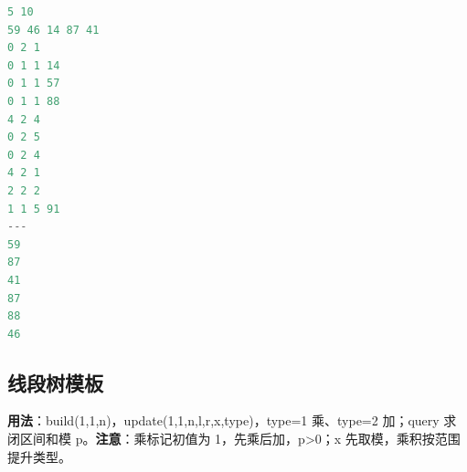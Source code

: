 \documentclass[a4paper,9pt]{extarticle}
\begin{document}
\begin{lstlisting}[language={C++}]
5 10
59 46 14 87 41
0 2 1
0 1 1 14
0 1 1 57
0 1 1 88
4 2 4
0 2 5
0 2 4
4 2 1
2 2 2
1 1 5 91
---
59
87
41
87
88
46
\end{lstlisting}

\subsection{线段树模板}

\textbf{用法}：build(\allowbreak{}1,\allowbreak{}1,\allowbreak{}n)，update(\allowbreak{}1,\allowbreak{}1,\allowbreak{}n,\allowbreak{}l,\allowbreak{}r,\allowbreak{}x,\allowbreak{}type)，type=\allowbreak{}1 乘、type=2 加；query 求闭区间和模 p。\textbf{注意}：乘标记初值为 1，先乘后加，p>0；x 先取模，乘积按范围提升类型。
\end{document}
